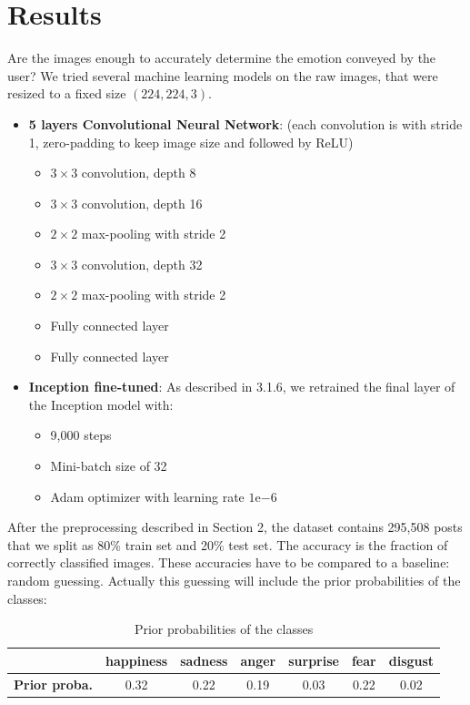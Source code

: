 \section{Results}
Are the images enough to accurately determine the emotion conveyed by the user? We tried several machine learning models on the raw images, that were resized to a fixed size $(224, 224, 3)$.
\begin{itemize}
    \item \textbf{5 layers Convolutional Neural Network}: (each convolution is with stride 1, zero-padding to keep image size and followed by ReLU)
    \begin{itemize}[topsep=0pt]
        \itemsep-1em
        \item $3\times 3$ convolution, depth 8
        \item $3\times 3$ convolution, depth 16
        \item $2\times 2$ max-pooling with stride 2
        \item $3\times 3$ convolution, depth 32
        \item $2 \times 2$ max-pooling with stride 2
        \item Fully connected layer
        \item Fully connected layer
    \end{itemize}
    \item \textbf{Inception fine-tuned}: As described in 3.1.6, we retrained the final layer of the Inception model with:
    \begin{itemize}[topsep=0pt]
        \itemsep-1em
        \item 9,000 steps
        \item Mini-batch size of 32
        \item Adam optimizer with learning rate $1\mathrm{e}{-6}$
    \end{itemize}
\end{itemize}

After the preprocessing described in Section 2, the dataset contains 295,508 posts that we split as 80\% train set and 20\% test set. The accuracy is the fraction of correctly classified images. These accuracies have to be compared to a baseline: random guessing. Actually this guessing will include the prior probabilities of the classes: 
\begin{table}[H]
\begin{center}
    \begin{tabular}{| c | c | c | c | c | c | c |}
    \hline
     & \textbf{happiness} & \textbf{sadness} &  \textbf{anger} & \textbf{surprise} & \textbf{fear} & \textbf{disgust} \\ \hline
    \textbf{Prior proba.} & 0.32 & 0.22 & 0.19 & 0.03 & 0.22 & 0.02 \\
    \hline
    \end{tabular}
\end{center} 
\caption{Prior probabilities of the classes}
\end{table}

